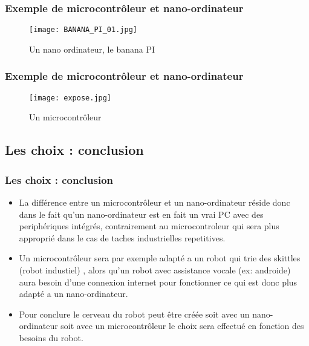 \documentclass{beamer}
\begin{document}
\begin{frame}
\frametitle{Exemple de microcontrôleur et nano-ordinateur}
\begin{figure}[!h]
\centering
\texttt{[image: BANANA\_PI\_01.jpg]}
\caption{Un nano ordinateur, le banana PI}
\end{figure}
\end{frame}
\begin{frame}
\frametitle{Exemple de microcontrôleur et nano-ordinateur}
\begin{figure}[!h]
\centering
\texttt{[image: expose.jpg]}
\caption{Un microcontrôleur}
\end{figure}
\end{frame}
\subsection{Les choix : conclusion}
\begin{frame}
\frametitle{Les choix : conclusion}
\begin{itemize}
    \item La différence entre un microcontrôleur et un nano-ordinateur réside donc dans le fait qu'un nano-ordinateur est en fait un vrai PC avec  des periphériques intégrés, contrairement au microcontroleur qui sera plus approprié dans le cas de taches industrielles repetitives.
  \item Un microcontrôleur sera par exemple adapté a un robot qui trie des skittles (robot industiel) , alors qu'un robot avec assistance vocale (ex: androide) aura besoin d'une connexion internet pour fonctionner ce qui est donc plus adapté a un nano-ordinateur.
\item Pour conclure le cerveau du robot peut être créée soit avec un nano-ordinateur soit avec un microcontrôleur le choix sera effectué en fonction des besoins du robot.
\end{itemize}
\end{frame}
\end{document}
